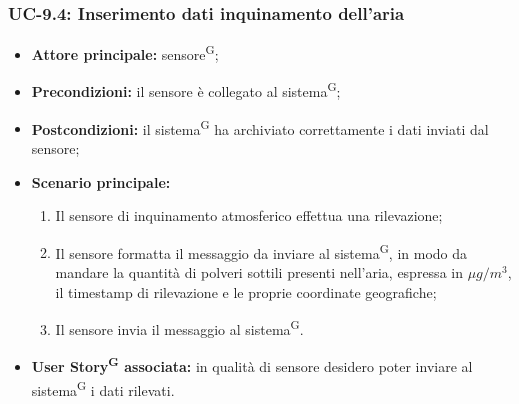 \documentclass[8pt]{article}
\newcommand{\glossterm}[1]{#1\textsuperscript{G}} %
\begin{document}
\subsubsection*{UC-9.4: Inserimento dati inquinamento dell'aria}
\begin{itemize}
    \item \textbf{Attore principale:} \glossterm{sensore};
    \item \textbf{Precondizioni:} il sensore è collegato al \glossterm{sistema};
    \item \textbf{Postcondizioni:} il \glossterm{sistema} ha archiviato correttamente i dati inviati dal sensore;
    \item \textbf{Scenario principale:}
        \begin{enumerate}
        \item Il sensore di inquinamento atmosferico effettua una rilevazione;
        \item Il sensore formatta il messaggio da inviare al \glossterm{sistema}, in modo da mandare la quantità di polveri sottili presenti nell'aria, espressa in $\mu g/m^3$, il timestamp di rilevazione e le proprie
coordinate geografiche;
        \item Il sensore invia il messaggio al \glossterm{sistema}.
        \end{enumerate}
    \item \textbf{\glossterm{User Story} associata:} in qualità di sensore desidero poter inviare al \glossterm{sistema} i
        dati rilevati.
\end{itemize}
\end{document}
